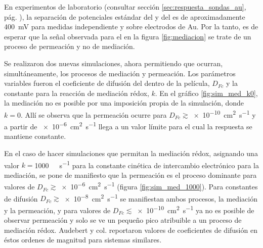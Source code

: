 		En experimentos de laboratorio (consultar sección \ref{sec:respuesta_sondas_au}, pág. \pageref{sec:respuesta_sondas_au}), la separación de potenciales estándar del \ru\space y del \fc\space es de aproximadamente \SI{400}{\milli\volt} para medidas independiente y sobre electrodos de Au. Por la tanto, es de esperar que la señal observada para el \fc\space en la figura \ref{fig:mediacion} se trate de un proceso de permeación y no de mediación.

		Se realizaron dos nuevas simulaciones, ahora permitiendo que ocurran, simultáneamente, los procesos de mediación y permeación. Los parámetros variables fueron el coeficiente de difusión del \fc\space dentro de la película, $D_{Fc}$ y la constante para la reacción de mediación rédox, $k$. En el gráfico \ref{fig:sim_med_k0}, la mediación no es posible por una imposición propia de la simulación, donde $k\!=\!0$. Allí se observa que la permeación ocurre para $D_{Fc}\!\!\gtrsim$\SI{e-10}{\square\cm\per\second} y a partir de \SI{e-6}{\square\cm\per\second} llega a un valor límite para el cual la respuesta se mantiene constante.

		En el caso de hacer simulaciones que permitan la mediación rédox, asignando una valor $k\!=$\SI{1000}{\per\Molar\per\second} para la constante cinética de intercambio electrónico para la mediación, se pone de manifiesto que la permeación es el proceso dominante para valores de $D_{Fc}\!\gtrsim$\SI{e-6}{\square\cm\per\second} (figura \ref{fig:sim_med_1000}). Para constantes de difusión $D_{Fc}\!\gtrsim$\SI{e-8}{\square\cm\per\second} se manifiestan ambos procesos, la mediación y la permeación, y para valores de $D_{Fc}\!\lesssim$\SI{e-10}{\square\cm\per\second} ya no es posible de observar permeación y solo se ve un pequeño pico atribuible a un proceso de mediación rédox. Audebert y col. reportaron valores de coeficientes de difusión en éstos ordenes de magnitud para sistemas similares\cite{Audebert2015}. 

